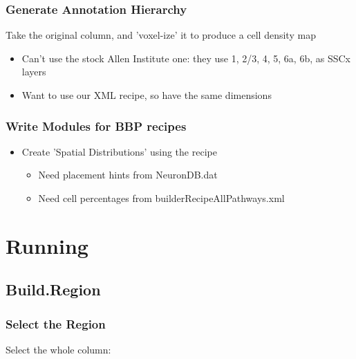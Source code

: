 \documentclass{beamer}
\begin{document}
\begin{frame}[fragile]
  \frametitle{Generate Annotation Hierarchy}
  Take the original column, and 'voxel-ize' it to produce a cell density map
  \begin{itemize}
     \item Can't use the stock Allen Institute one: they use 1, 2/3, 4, 5, 6a, 6b, as SSCx layers
     \item Want to use our XML recipe, so have the same dimensions
  \end{itemize}
  
\end{frame}

\begin{frame}
   \frametitle{Write Modules for BBP recipes}
  \begin{itemize}
     \item Create 'Spatial Distributions' using the recipe
     \begin{itemize}
        \item Need placement hints from NeuronDB.dat
        \item Need cell percentages from builderRecipeAllPathways.xml
     \end{itemize}
  \end{itemize}
\end{frame}

\section{Running}
\subsection{Build.Region}
\begin{frame}
  \frametitle{Select the Region}
  Select the whole column:

\end{frame}
\end{document}
